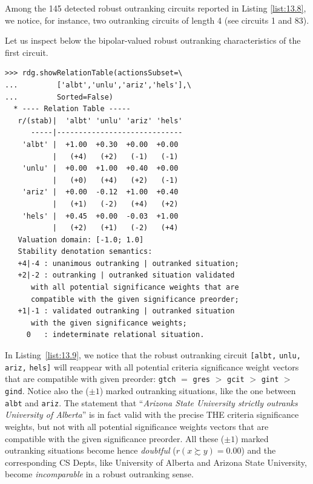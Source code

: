 Among the 145 detected robust outranking circuits reported in Listing \vref{list:13.8}, we notice, for instance, two outranking circuits of length 4 (see circuits 1 and 83).

Let us inspect below the bipolar-valued robust outranking characteristics of the first circuit.
\begin{lstlisting}[caption={Showing the relation table with stability denotation},label=list:13.9]
>>> rdg.showRelationTable(actionsSubset=\
...         ['albt','unlu','ariz','hels'],\
...         Sorted=False) 
  * ---- Relation Table -----
   r/(stab)|  'albt' 'unlu' 'ariz' 'hels'   
      -----|-----------------------------
    'albt' |  +1.00  +0.30  +0.00  +0.00  
           |   (+4)   (+2)   (-1)   (-1)  
    'unlu' |  +0.00  +1.00  +0.40  +0.00  
           |   (+0)   (+4)   (+2)   (-1)  
    'ariz' |  +0.00  -0.12  +1.00  +0.40  
           |   (+1)   (-2)   (+4)   (+2)  
    'hels' |  +0.45  +0.00  -0.03  +1.00  
           |   (+2)   (+1)   (-2)   (+4)  
   Valuation domain: [-1.0; 1.0]
   Stability denotation semantics:
   +4|-4 : unanimous outranking | outranked situation;
   +2|-2 : outranking | outranked situation validated
      with all potential significance weights that are
      compatible with the given significance preorder;
   +1|-1 : validated outranking | outranked situation
      with the given significance weights;
     0   : indeterminate relational situation.
\end{lstlisting}

In Listing~\vref{list:13.9}, we notice that the robust outranking circuit \texttt{[albt,} \texttt{unlu,} \texttt{ariz,} \texttt{hels]}  will reappear with all potential criteria significance weight vectors that are compatible with given preorder: \texttt{gtch} $=$ \texttt{gres} $>$ \texttt{gcit} $>$ \texttt{gint} $>$ \texttt{gind}. Notice also the ($\pm 1$) marked outranking situations, like the one between \texttt{albt} and \texttt{ariz}. The statement that ``\emph{Arizona State University strictly  outranks University of Alberta}'' is in fact valid with the precise THE criteria significance weights, but not with all potential significance weights vectors that are compatible with the given significance preorder. All these ($\pm 1$)  marked outranking situations become hence \emph{doubtful} ($r(x \succsim y) = 0.00$) and the corresponding CS Depts, like University of Alberta and Arizona State University, become \emph{incomparable} in a robust outranking sense.  

